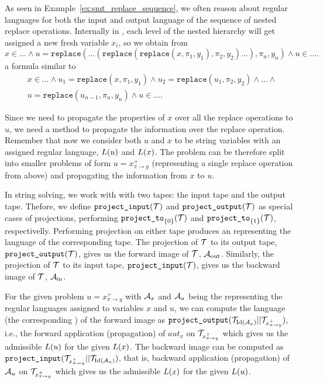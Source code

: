 As seen in Example~\ref{ex:smt_replace_sequence}, we often reason about regular languages for both the input and output language of the sequence of nested replace operations.
Internally in \noodler, each level of the nested hierarchy will get assigned a new fresh variable $x_i$, so we obtain from
$$
x \in \ldots \land u = \texttt{replace}(\ldots (\texttt{replace}(\texttt{replace}(x, \pi_1, y_1), \pi_2, y_2)\ldots), \pi_n, y_n) \land u \in \ldots \text{.}
$$
a formula similar to
\begin{multline*}
x \in \ldots \land u_1 = \texttt{replace}(x, \pi_1, y_1) \land u_2 = \texttt{replace}(u_1, \pi_2, y_2) \land \ldots \land \\u = \texttt{replace}(u_{n-1}, \pi_n, y_n) \land u \in \ldots \text{.}
\end{multline*}

Since we need to propagate the properties of $x$ over all the replace operations to $u$, we need a method to propagate the information over the replace operation.
Remember that now we consider both $u$ and $x$ to be string variables with an assigned regular language, $L(u)$ and $L(x)$.
The problem can be therefore split into smaller problems of form $ u = x^{+}_{\pi \rightarrow y}$ (representing a single replace operation from above) and propagating the information from $x$ to $u$.

In string solving, we work with \nfts with two tapes: the input tape and the output tape.
Thefore, we define $\texttt{project\_input}(\mathcal{T})$ and $\texttt{project\_output}(\mathcal{T})$ as special cases of projections, performing $\texttt{project\_to}_{\{ 0 \}}(\mathcal{T})$ and $\texttt{project\_to}_{\{ 1 \}}(\mathcal{T})$, respectivelly.
Performing projection on either tape produces an \nfa representing the language of the corresponding tape.
The projection of \nft $\mathcal{T}$ to its output tape, $\texttt{project\_output}(\mathcal{T})$, gives us the forward image of $\mathcal{T}$, \nfa $\mathcal{A}_{\text{out}}$.
Similarly, the projection of \nft $\mathcal{T}$ to its input tape, $\texttt{project\_input}(\mathcal{T})$, gives us the backward image of $\mathcal{T}$, \nfa $\mathcal{A}_{\text{in}}$.

For the given problem $ u = x^{+}_{\pi \rightarrow y}$ with $\mathcal{A}_x$ and $\mathcal{A}_u$ being the \nfas representing the regular languages assigned to variables $x$ and $u$, we can compute the language (the corresponding \nfa) of the forward image as $\texttt{project\_output}(\mathcal{T}_{\text{Id}(\mathcal{A}_x)} || \mathcal{T}_{x^+_{\pi \rightarrow y}})$, i.e., the forward application (propagation) of $aut_x$ on $\mathcal{T}_{x^+_{\pi \rightarrow y}}$ which gives us the admissible $L(u)$ for the given $L(x)$.
The backward image can be computed as $\texttt{project\_input}(\mathcal{T}_{x^+_{\pi \rightarrow y}} || \mathcal{T}_{\text{Id}(\mathcal{A}_u)})$, that is, backward application (propagation) of $\mathcal{A}_u$ on $\mathcal{T}_{x^+_{\pi \rightarrow y}}$ which gives us the admissible $L(x)$ for the given $L(u)$.

